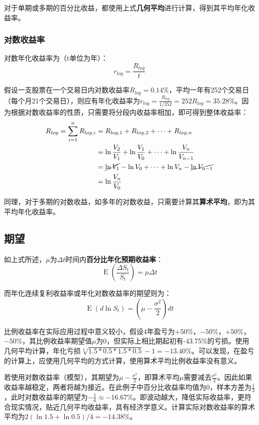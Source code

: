 \documentclass[11pt]{article}
\newcommand{\E}{\operatorname{E}}
\begin{document}
对于单期或多期的百分比收益，都使用上式\textbf{几何平均}进行计算，得到其平均年化收益率。

\subsubsection*{对数收益率}

对数年化收益率为（t单位为年）：
\begin{equation*}
    r_{log} = \frac{R_{log}}{t}
\end{equation*}

假设一支股票在一个交易日内对数收益率$R_{log}=0.14\%$，平均一年有252个交易日（每个月21个交易日），则应有年化收益率为$r_{log} = \frac{R_{log}}{1/252} = 252R_{log} = 35.28\%$。因为根据对数收益率的性质，只需要将分段内收益率相加，即可得到整体收益率：
\begin{align*}
    R_{log} = \sum^{n}_{i=1} R_{log,i} & = R_{log,1} + R_{log,2} + \dots + R_{log,n} \\ 
    &= \ln\frac{V_2}{V_1} + \ln\frac{V_1}{V_0} + \dots + \ln\frac{V_n}{V_{n-1}} \\
    &= \cancel{\ln V_1} - \ln V_0 + \dots + \ln V_n - \cancel{\ln V_{n-1}} \\
    &= \ln\frac{V_n}{V_0} 
\end{align*}

同理，对于多期的对数收益，如多年的对数收益，只需要计算其\textbf{算术平均}，即为其平均年化收益率。

\subsection{期望}

如上式所述，$\mu$为$\Delta t$时间内\textbf{百分比年化预期收益率}：
\begin{equation*}
    \E(\frac{\Delta S_t}{S_t}) = \mu \Delta t
\end{equation*}

而年化连续复利收益率或年化对数收益率的期望则为：
\begin{equation*}
    \E(d\ln S_t) = (\mu - \frac{\sigma^2}{2})dt
\end{equation*}

比例收益率在实际应用过程中意义较小，假设4年盈亏为$+50\%$，$-50\%$，$+50\%$，$-50\%$，其比例收益率期望值$\mu$为0，但实际上相比期起初有-43.75\%的亏损。使用几何平均计算，年化亏损$\sqrt[4]{1.5*0.5*1.5*0.5} - 1 = -13.40\%$。可以发现，在盈亏的计算上，应使用几何平均的方式计算，使用算术平均比例收益率没有意义。

若使用对数收益率（模型），其期望为$\mu-\frac{\sigma^2}{2}$，即算术平均$\mu$需要减去$\frac{\sigma^2}{2}$。因此如果收益率越稳定，两者将越为接近。在此例子中百分比收益率均值为0，样本方差为$\frac{1}{3}$，此时对数收益率的期望为$-\frac{1}{6}\approx -16.67\%$。即波动越大，降低实际收益率，更符合现实情况，贴近几何平均收益率，具有经济学意义。计算实际对数收益率的算术平均为$2(\ln 1.5 + \ln 0.5)/4 = -14.38\%$。
\end{document}

